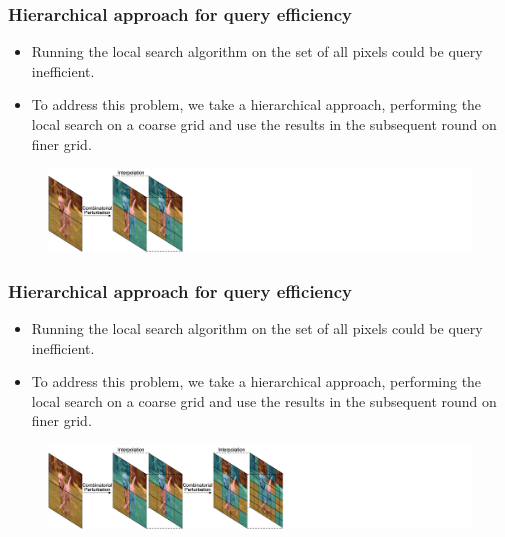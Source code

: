 \documentclass[10pt,mathserif]{beamer}
\begin{document}
\begin{frame}
    \frametitle{Hierarchical approach for query efficiency}
    \begin{itemize}\itemsep=12pt
        \item Running the local search algorithm on the set of all pixels could be query inefficient.
        \item To address this problem, we take a hierarchical approach, performing the local search on a coarse grid and use the results in the subsequent round on finer grid.
    \end{itemize}
    \begin{figure}
        \centering
        \hspace*{-2.5em}
        \includegraphics[scale=0.35]{figures/hierarchical_2.png}
    \end{figure}
\end{frame}

\begin{frame}
    \frametitle{Hierarchical approach for query efficiency}
    \begin{itemize}\itemsep=12pt
        \item Running the local search algorithm on the set of all pixels could be query inefficient.
        \item To address this problem, we take a hierarchical approach, performing the local search on a coarse grid and use the results in the subsequent round on finer grid.
    \end{itemize}
    \begin{figure}
        \centering
        \hspace*{-2.5em}
        \includegraphics[scale=0.35]{figures/hierarchical_3.png}
    \end{figure}
\end{frame}
\end{document}
